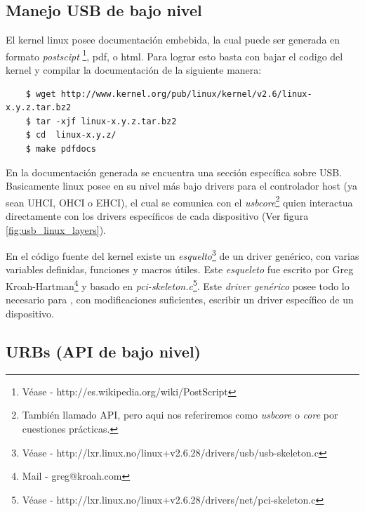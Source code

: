 \subsection{Manejo USB de bajo nivel}

El kernel linux posee documentaci\'on embebida, la cual puede ser generada en
formato \emph{postscipt} \footnote{V\'ease -
http://es.wikipedia.org/wiki/PostScript}, pdf, o html. Para lograr esto basta
con bajar el codigo del kernel y compilar la documentaci\'on de la siguiente
manera:

\begin{scriptsize}
	\begin{verbatim}
	$ wget http://www.kernel.org/pub/linux/kernel/v2.6/linux-x.y.z.tar.bz2
	$ tar -xjf linux-x.y.z.tar.bz2
	$ cd  linux-x.y.z/
	$ make pdfdocs
	\end{verbatim}
\end{scriptsize}

En la documentaci\'on generada se encuentra una secci\'on espec\'ifica sobre
USB.\\

Basicamente linux posee en su nivel m\'as bajo drivers para el controlador
host (ya sean UHCI, OHCI o EHCI), el cual se comunica con el
\emph{usbcore}\footnote{Tambi\'en llamado API, pero aqui nos referiremos como
\emph{usbcore} o \emph{core} por cuestiones pr\'acticas.} quien interactua
directamente con los drivers espec\'ificos de cada dispositivo (Ver figura
\ref{fig:usb_linux_layers}).


En el c\'odigo fuente del kernel existe un \emph{esquelto}\footnote{V\'ease
- http://lxr.linux.no/linux+v2.6.28/drivers/usb/usb-skeleton.c} de un driver
gen\'erico, con varias variables definidas, funciones y macros \'utiles.
Este \emph{esqueleto} fue escrito por Greg Kroah-Hartman\footnote{Mail - 
greg@kroah.com} y basado en \emph{pci-skeleton.c}\footnote{V\'ease -
http://lxr.linux.no/linux+v2.6.28/drivers/net/pci-skeleton.c}.
Este \emph{driver gen\'erico} posee todo lo necesario para , con
modificaciones suficientes, escribir un driver espec\'ifico de un dispositivo.


\subsection{URBs (API de bajo nivel)}

